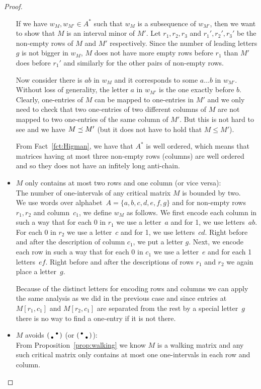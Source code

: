 \begin{proof}
\begin{itemize}
		If we have $w_M,w_{M'}\in A^*$ such that $w_M$ is a subsequence of $w_{M'}$, then we want to show that $M$ is an interval minor of $M'$. Let $r_1,r_2,r_3$ and $r_1',r_2',r_3'$ be the non-empty rows of $M$ and $M'$ respectively. Since the number of leading letters $g$ is not bigger in $w_M$, $M$ does not have more empty rows before $r_1$ than $M'$ does before $r_1'$ and similarly for the other pairs of non-empty rows.

		Now consider there is $ab$ in $w_M$ and it corresponds to some $a\dots b$ in $w_{M'}$. Without loss of generality, the letter $a$ in $w_{M'}$ is the one exactly before $b$. Clearly, one-entries of $M$ can be mapped to one-entries in $M'$ and we only need to check that two one-entries of two different columns of $M$ are not mapped to two one-entries of the same column of $M'$. But this is not hard to see and we have $M\preceq M'$ (but it does not have to hold that $M\leq M'$).

		From Fact~\ref{fct:Higman}, we have that $A^*$ is well ordered, which means that matrices having at most three non-empty rows (columns) are well ordered and so they does not have an infitely long anti-chain.
	\item $M$ only contains at most two rows and one column (or vice versa):\\
		The number of one-intervals of any critical matrix $M$ is bounded by two.\\
		
		We use words over alphabet~$A=\{a,b,c,d,e,f,g\}$ and for non-empty rows~$r_1,r_2$ and column~$c_1$, we define $w_M$ as follows. We first encode each column in such a way that for each 0 in $r_1$ we use a letter~$a$ and for 1, we use letters~$ab$. For each 0 in $r_2$ we use a letter~$c$ and for 1, we use letters~$cd$. Right before and after the description of column $c_1$, we put a letter $g$. Next, we encode each row in such a way that for each 0 in $c_1$ we use a letter~$e$ and for each 1 letters~$ef$. Right before and after the descriptions of rows $r_1$ and $r_2$ we again place a letter~$g$.
		
		Because of the distinct letters for encoding rows and columns we can apply the same analysis as we did in the previous case and since entries at $M[r_1,c_1]$ and $M[r_2,c_1]$ are separated from the rest by a special letter~$g$ there is no way to find a one-entry if it is not there.
	\item $M$ avoids $\left(\begin{smallmatrix} &\bullet\\\bullet& \end{smallmatrix}\right)$ (or $\left(\begin{smallmatrix}\bullet& \\ &\bullet\end{smallmatrix}\right)$):\\
		From Proposition~\ref{prop:walking} we know $M$ is a walking matrix and any such critical matrix only contains at most one one-intervals in each row and column.\\
		

\end{itemize}
\end{proof}
